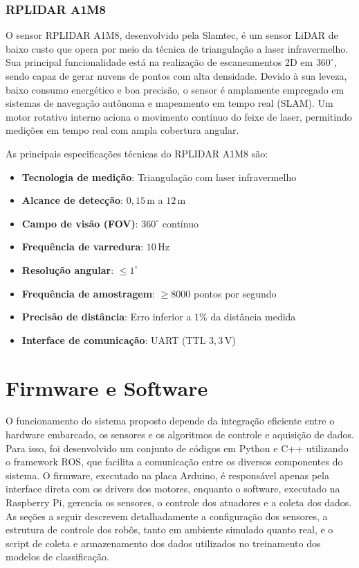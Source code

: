 \subsubsection{RPLIDAR A1M8}

O sensor RPLIDAR A1M8, desenvolvido pela Slamtec, é um sensor LiDAR de baixo custo que opera por meio da técnica de triangulação a laser infravermelho. Sua principal funcionalidade está na realização de escaneamentos 2D em $360^\circ$, sendo capaz de gerar nuvens de pontos com alta densidade. Devido à sua leveza, baixo consumo energético e boa precisão, o sensor é amplamente empregado em sistemas de navegação autônoma e mapeamento em tempo real (SLAM). Um motor rotativo interno aciona o movimento contínuo do feixe de laser, permitindo medições em tempo real com ampla cobertura angular.

As principais especificações técnicas do RPLIDAR A1M8 são:

\begin{itemize}
    \item \textbf{Tecnologia de medição}: Triangulação com laser infravermelho
    \item \textbf{Alcance de detecção}: $0{,}15\,\text{m}$ a $12\,\text{m}$
    \item \textbf{Campo de visão (FOV)}: $360^\circ$ contínuo
    \item \textbf{Frequência de varredura}: $10\,\text{Hz}$
    \item \textbf{Resolução angular}: $\leq 1^\circ$
    \item \textbf{Frequência de amostragem}: $\geq 8000$ pontos por segundo
    \item \textbf{Precisão de distância}: Erro inferior a $1\%$ da distância medida
    \item \textbf{Interface de comunicação}: UART (TTL $3{,}3\,\text{V}$)
\end{itemize}

\section{Firmware e Software}

O funcionamento do sistema proposto depende da integração eficiente entre o hardware embarcado, os sensores e os algoritmos de controle e aquisição de dados. Para isso, foi desenvolvido um conjunto de códigos em Python e C++ utilizando o framework ROS, que facilita a comunicação entre os diversos componentes do sistema. O firmware, executado na placa Arduino, é responsável apenas pela interface direta com os drivers dos motores, enquanto o software, executado na Raspberry Pi, gerencia os sensores, o controle dos atuadores e a coleta dos dados. As seções a seguir descrevem detalhadamente a configuração dos sensores, a estrutura de controle dos robôs, tanto em ambiente simulado quanto real, e o script de coleta e armazenamento dos dados utilizados no treinamento dos modelos de classificação.

